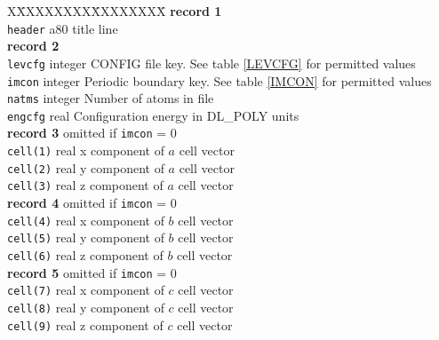 \begin{tabbing}
X\=XXXXXXXX\=XXXXXXXX\=\kill
{\bf record 1}\\
\> {\tt header} \> a80 \> title line\\
{\bf record 2}\\
\> {\tt levcfg} \> integer \> CONFIG file key. See table \ref{LEVCFG}
for permitted values\\
\> {\tt imcon} \> integer \> Periodic boundary key. See table
\ref{IMCON} for permitted values\\
\> {\tt natms} \> integer \> Number of atoms in file \\
\> {\tt engcfg} \> real \> Configuration energy in DL\_POLY units\\
{\bf record 3} \> \> omitted if {\tt imcon} = 0\\
\> {\tt cell(1)}\> real \> x component of $a$ cell vector\\
\> {\tt cell(2)}\> real \> y component of $a$ cell vector\\
\> {\tt cell(3)}\> real \> z component of $a$ cell vector\\
{\bf record 4} \> \> omitted if {\tt imcon} = 0\\
\> {\tt cell(4)}\> real \> x component of $b$ cell vector\\
\> {\tt cell(5)}\> real \> y component of $b$ cell vector\\
\> {\tt cell(6)}\> real \> z component of $b$ cell vector\\
{\bf record 5} \> \> omitted if {\tt imcon} = 0\\
\> {\tt cell(7)}\> real \> x component of $c$ cell vector\\
\> {\tt cell(8)}\> real \> y component of $c$ cell vector\\
\> {\tt cell(9)}\> real \> z component of $c$ cell vector\\
\end{tabbing}

